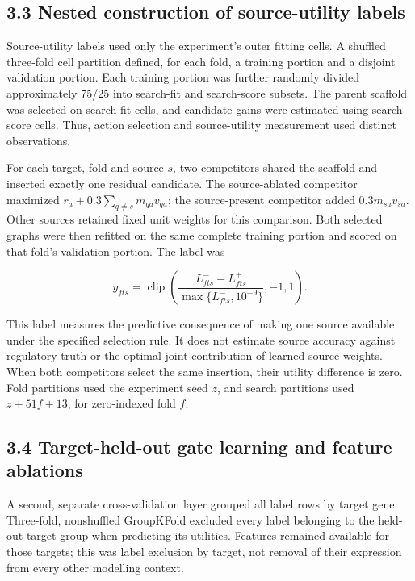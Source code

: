 \documentclass[
  11pt,
]{article}
\begin{document}
\subsection{3.3 Nested construction of source-utility
labels}\label{nested-construction-of-source-utility-labels}

Source-utility labels used only the experiment's outer fitting cells. A
shuffled three-fold cell partition defined, for each fold, a training
portion and a disjoint validation portion. Each training portion was
further randomly divided approximately 75/25 into search-fit and
search-score subsets. The parent scaffold was selected on search-fit
cells, and candidate gains were estimated using search-score cells.
Thus, action selection and source-utility measurement used distinct
observations.

For each target, fold and source \(s\), two competitors shared the
scaffold and inserted exactly one residual candidate. The source-ablated
competitor maximized \(r_a+0.3\sum_{q\ne s}m_{qa}v_{qa}\); the
source-present competitor added \(0.3m_{sa}v_{sa}\). Other sources
retained fixed unit weights for this comparison. Both selected graphs
were then refitted on the same complete training portion and scored on
that fold's validation portion. The label was

\[
y_{fts}=\operatorname{clip}\!\left(
\frac{L^-_{fts}-L^+_{fts}}{\max\{L^-_{fts},10^{-9}\}},-1,1
\right).
\]

This label measures the predictive consequence of making one source
available under the specified selection rule. It does not estimate
source accuracy against regulatory truth or the optimal joint
contribution of learned source weights. When both competitors select the
same insertion, their utility difference is zero. Fold partitions used
the experiment seed \(z\), and search partitions used \(z+51f+13\), for
zero-indexed fold \(f\).

\subsection{3.4 Target-held-out gate learning and feature
ablations}\label{target-held-out-gate-learning-and-feature-ablations}

A second, separate cross-validation layer grouped all label rows by
target gene. Three-fold, nonshuffled GroupKFold excluded every label
belonging to the held-out target group when predicting its utilities.
Features remained available for those targets; this was label exclusion
by target, not removal of their expression from every other modelling
context.
\end{document}
